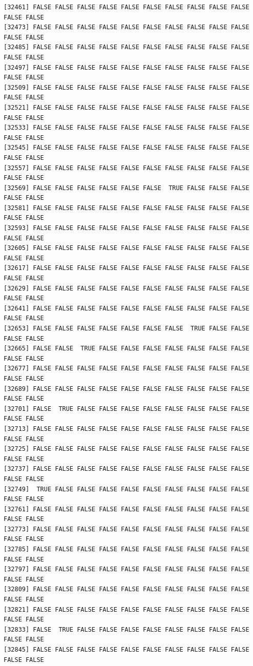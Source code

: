 \documentclass[
  a4paper,
  DIV=11,
  numbers=noendperiod]{scrartcl}
\begin{document}
\begin{verbatim}
[32461] FALSE FALSE FALSE FALSE FALSE FALSE FALSE FALSE FALSE FALSE FALSE FALSE
[32473] FALSE FALSE FALSE FALSE FALSE FALSE FALSE FALSE FALSE FALSE FALSE FALSE
[32485] FALSE FALSE FALSE FALSE FALSE FALSE FALSE FALSE FALSE FALSE FALSE FALSE
[32497] FALSE FALSE FALSE FALSE FALSE FALSE FALSE FALSE FALSE FALSE FALSE FALSE
[32509] FALSE FALSE FALSE FALSE FALSE FALSE FALSE FALSE FALSE FALSE FALSE FALSE
[32521] FALSE FALSE FALSE FALSE FALSE FALSE FALSE FALSE FALSE FALSE FALSE FALSE
[32533] FALSE FALSE FALSE FALSE FALSE FALSE FALSE FALSE FALSE FALSE FALSE FALSE
[32545] FALSE FALSE FALSE FALSE FALSE FALSE FALSE FALSE FALSE FALSE FALSE FALSE
[32557] FALSE FALSE FALSE FALSE FALSE FALSE FALSE FALSE FALSE FALSE FALSE FALSE
[32569] FALSE FALSE FALSE FALSE FALSE FALSE  TRUE FALSE FALSE FALSE FALSE FALSE
[32581] FALSE FALSE FALSE FALSE FALSE FALSE FALSE FALSE FALSE FALSE FALSE FALSE
[32593] FALSE FALSE FALSE FALSE FALSE FALSE FALSE FALSE FALSE FALSE FALSE FALSE
[32605] FALSE FALSE FALSE FALSE FALSE FALSE FALSE FALSE FALSE FALSE FALSE FALSE
[32617] FALSE FALSE FALSE FALSE FALSE FALSE FALSE FALSE FALSE FALSE FALSE FALSE
[32629] FALSE FALSE FALSE FALSE FALSE FALSE FALSE FALSE FALSE FALSE FALSE FALSE
[32641] FALSE FALSE FALSE FALSE FALSE FALSE FALSE FALSE FALSE FALSE FALSE FALSE
[32653] FALSE FALSE FALSE FALSE FALSE FALSE FALSE  TRUE FALSE FALSE FALSE FALSE
[32665] FALSE FALSE  TRUE FALSE FALSE FALSE FALSE FALSE FALSE FALSE FALSE FALSE
[32677] FALSE FALSE FALSE FALSE FALSE FALSE FALSE FALSE FALSE FALSE FALSE FALSE
[32689] FALSE FALSE FALSE FALSE FALSE FALSE FALSE FALSE FALSE FALSE FALSE FALSE
[32701] FALSE  TRUE FALSE FALSE FALSE FALSE FALSE FALSE FALSE FALSE FALSE FALSE
[32713] FALSE FALSE FALSE FALSE FALSE FALSE FALSE FALSE FALSE FALSE FALSE FALSE
[32725] FALSE FALSE FALSE FALSE FALSE FALSE FALSE FALSE FALSE FALSE FALSE FALSE
[32737] FALSE FALSE FALSE FALSE FALSE FALSE FALSE FALSE FALSE FALSE FALSE FALSE
[32749]  TRUE FALSE FALSE FALSE FALSE FALSE FALSE FALSE FALSE FALSE FALSE FALSE
[32761] FALSE FALSE FALSE FALSE FALSE FALSE FALSE FALSE FALSE FALSE FALSE FALSE
[32773] FALSE FALSE FALSE FALSE FALSE FALSE FALSE FALSE FALSE FALSE FALSE FALSE
[32785] FALSE FALSE FALSE FALSE FALSE FALSE FALSE FALSE FALSE FALSE FALSE FALSE
[32797] FALSE FALSE FALSE FALSE FALSE FALSE FALSE FALSE FALSE FALSE FALSE FALSE
[32809] FALSE FALSE FALSE FALSE FALSE FALSE FALSE FALSE FALSE FALSE FALSE FALSE
[32821] FALSE FALSE FALSE FALSE FALSE FALSE FALSE FALSE FALSE FALSE FALSE FALSE
[32833] FALSE  TRUE FALSE FALSE FALSE FALSE FALSE FALSE FALSE FALSE FALSE FALSE
[32845] FALSE FALSE FALSE FALSE FALSE FALSE FALSE FALSE FALSE FALSE FALSE FALSE

\end{verbatim}
\end{document}

